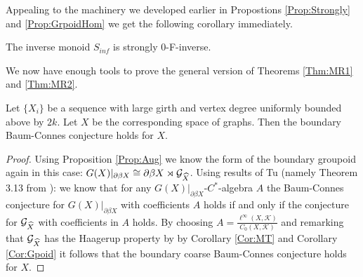 Appealing to the machinery we developed earlier in Propostions \ref{Prop:Strongly} and \ref{Prop:GrpoidHom} we get the following corollary immediately.

\begin{corollary}\label{Cor:MT}
The inverse monoid $S_{inf}$ is strongly 0-F-inverse.
\end{corollary}

We now have enough tools to prove the general version of Theorems \ref{Thm:MR1} and \ref{Thm:MR2}. 

\begin{theorem}
Let $\lbrace X_{i} \rbrace$ be a sequence with large girth and vertex degree uniformly bounded above by $2k$. Let $X$ be the corresponding space of graphs. Then the boundary Baum-Connes conjecture holds for $X$.
\end{theorem}
\begin{proof}
Using Proposition \ref{Prop:Aug} we know the form of the boundary groupoid again in this case: $G(X)|_{\partial\beta X} \cong \partial\beta X \rtimes \mathcal{G}_{\widehat{X}}$. Using results of Tu (namely Theorem 3.13 from \cite{cbcag2}): we know that for any $G(X)|_{\partial\beta X}$-$C^{*}$-algebra $A$ the Baum-Connes conjecture for $G(X)|_{\partial\beta X}$ with coefficients $A$ holds if and only if the conjecture for $\mathcal{G}_{\widehat{X}}$ with coefficients in $A$ holds. By choosing $A= \frac{\ell^{\infty}(X,\mathcal{K})}{C_{0}(X,\mathcal{K})}$ and remarking that $\mathcal{G}_{\widehat{X}}$ has the Haagerup property by by Corollary \ref{Cor:MT} and Corollary \ref{Cor:Gpoid} it follows that the boundary coarse Baum-Connes conjecture holds for $X$.
\end{proof}